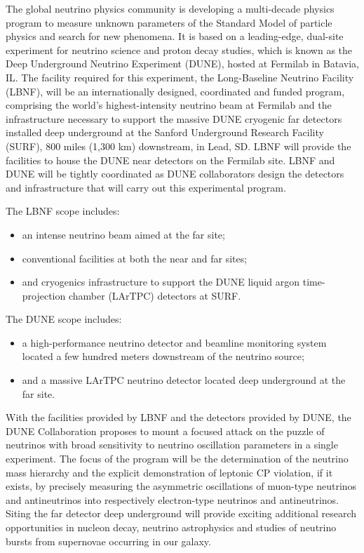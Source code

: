 

The global neutrino physics community is developing a multi-decade
physics program to measure unknown parameters of the Standard Model of
particle physics and search for new phenomena.  It is based on a
leading-edge, dual-site experiment
for neutrino science and proton decay studies, which is known as the Deep Underground
Neutrino Experiment (DUNE), hosted at Fermilab in Batavia, IL. The
facility required for this experiment, the Long-Baseline Neutrino
Facility (LBNF), will be an internationally designed, coordinated and
funded program, comprising the world's highest-intensity neutrino beam
at Fermilab and the infrastructure necessary to support the massive
DUNE cryogenic far detectors installed deep underground at the Sanford
Underground Research Facility (SURF), 800 miles (1,300 km) downstream,
in Lead, SD. LBNF will provide the facilities to house the DUNE near
detectors on the Fermilab site. LBNF and DUNE will be tightly
coordinated as DUNE collaborators design the detectors and
infrastructure that will carry out this experimental program.
  
The LBNF scope includes:
\begin{itemize}
\item an intense neutrino beam aimed at the far site;
\item conventional facilities at both the near and far sites;
\item and cryogenics infrastructure to support the DUNE
  liquid argon time-projection chamber (LArTPC) detectors at SURF.
\end{itemize}

The DUNE scope includes:
\begin{itemize}
\item %
a high-performance neutrino detector and beamline monitoring system
located a few hundred meters downstream of the neutrino source;
\item and a massive LArTPC neutrino detector located deep underground at
  the far site.
\end{itemize}

With the facilities provided by LBNF and the detectors
provided by DUNE, the DUNE Collaboration proposes to mount a focused
attack on the puzzle of neutrinos with broad sensitivity to neutrino
oscillation parameters in a single experiment.  The focus of the
program will be the determination of the neutrino mass hierarchy and the explicit demonstration of leptonic CP violation,
if it exists, by precisely measuring the asymmetric oscillations of
muon-type neutrinos and antineutrinos into respectively electron-type neutrinos and
antineutrinos.  Siting the far detector deep underground will provide
exciting additional research opportunities in nucleon decay, neutrino
astrophysics and studies of neutrino bursts from supernovae occurring
in our galaxy.
